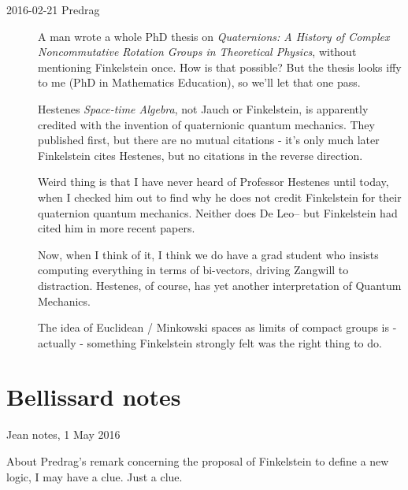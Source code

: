 \begin{description}
\item[2016-02-21 Predrag]
A man wrote a whole PhD thesis
    on {\em Quaternions: A History of Complex Noncommutative Rotation
    Groups in Theoretical Physics}, without mentioning  Finkelstein
    \etal{} once. How is that possible? But the
    thesis looks iffy to me (PhD in Mathematics Education), so we'll
    let that one pass.

Hestenes {\em Space-time Algebra}, not Jauch or
Finkelstein, is apparently credited with the
invention of quaternionic quantum mechanics. They published first, but
there are no mutual citations - it's only much later Finkelstein cites
Hestenes, but no citations in the reverse direction.

Weird thing is that I have never heard of Professor Hestenes until
today, when I checked him out to find why he does not credit
Finkelstein \etal{} for their quaternion quantum
mechanics. Neither does De Leo-- but Finkelstein had cited
him in more recent papers.

Now, when I think of it, I think we do have a grad student who insists
computing everything in terms of bi-vectors, driving Zangwill to
distraction. Hestenes, of course, has yet another interpretation of
Quantum Mechanics.

The idea of Euclidean / Minkowski spaces as limits of compact groups is
- actually - something Finkelstein strongly felt was the right thing to
do.





\end{description}

\section{Bellissard notes}
\label{sect:Bellissard}

Jean notes, 1 May 2016

About Predrag's remark concerning the proposal of Finkelstein to define a
new logic, I may have a clue. Just a clue.

